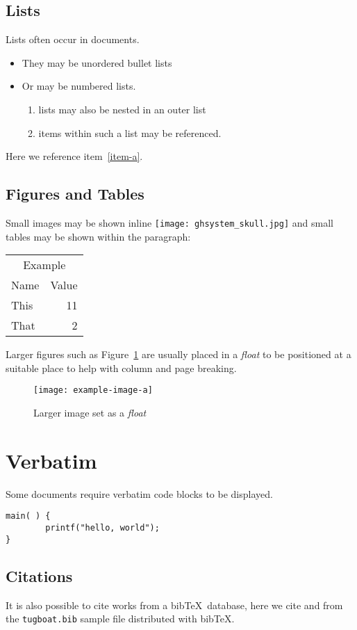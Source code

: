\documentclass[a4paper,twocolumn]{article}
\providecommand\tagpdfsetup[1]{}
\begin{document}
\subsection{Lists}
Lists
 often occur in documents.
\begin{itemize}
\item They may be unordered bullet lists
\item Or may be numbered lists.
  \begin{enumerate}
  \item lists may also be nested in an outer list
  \item \label{item-a}items within such a list may be referenced.
  \end{enumerate}
\end{itemize}
Here we reference item~\ref{item-a}.

\subsection{Figures and Tables}

Small images may be shown inline
\texttt{[image: ghsystem\_skull.jpg]}
and small tables may be shown within the paragraph:
\begin{center}
\tagpdfsetup{table/header-rows={1,2}}
\begin{tabular}{lr}
\multicolumn{2}{c}{Example}\\
Name&Value\\
This& 11 \\
That & 2
\end{tabular}
\end{center}

Larger figures such as Figure~\ref{float} are usually placed in a
\emph{float} to be positioned at a suitable place to help with column
and page breaking.
\begin{figure}
  \centering
  \texttt{[image: example-image-a]}
  \caption{\label{float}Larger image set as a \emph{float}}
\end{figure}

\section{Verbatim}
Some documents require verbatim code blocks to be displayed.
\begin{verbatim}
main( ) {
        printf("hello, world");
}
\end{verbatim}

\subsection{Citations}
It is also possible to cite works from a bib\TeX\ database, here we
cite \cite{Knuth:TB5-1-67} and \cite{Hoekwater:TB28-3-312} from the
\texttt{tugboat.bib} sample file distributed with bib\TeX.


\raggedright

\end{document}
